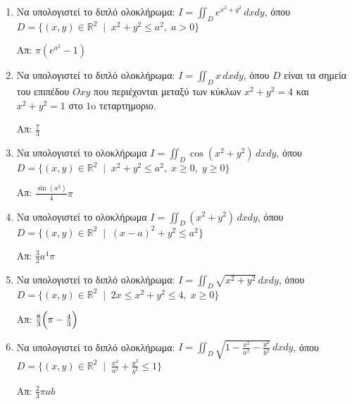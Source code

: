 


\pagestyle{empty}
\everymath{\displaystyle}



\begin{center}
\end{center}

\vspace{\baselineskip}

\begin{enumerate}

\item Να υπολογιστεί το διπλό ολοκλήρωμα: $I=\iint_{D}e^{x^2+y^2}\,dxdy$, όπου $D=\{(x,y)\in\mathbb{R}^2\;\mid\; x^2+y^2\leq a^2,\; a>0\}$

\hfill Απ: $\pi(e^{a^2}-1)$

\item Να υπολογιστεί το διπλό ολοκλήρωμα: $I=\iint_{D}x\,dxdy$, όπου $D$ είναι τα σημεία του επιπέδου $Oxy$ που περιέχονται μεταξύ των κύκλων $x^2+y^2=4$ και $x^2+y^2=1$ στο $1$o τεταρτημοριο.

\hfill Απ: $\frac{7}{3}$

\item Να υπολογιστεί το ολοκλήρωμα $I=\iint_{D}\cos(x^2+y^2)\,dxdy$, όπου
	$D=\{(x,y)\in\mathbb{R}^2\;\mid\; x^2+y^2\leq a^{2},\;x\geq 0,\; y\geq 0\}$

\hfill Απ: $\frac{\sin(a^2)}{4}\pi$

\item Να υπολογιστεί το ολοκλήρωμα $I=\iint_{D}(x^2+y^2)\,dxdy$, όπου $D=\{(x,y)\in\mathbb{R}^2\;\mid\; (x-a)^2+y^2\leq a^2\}$

\hfill Απ: $\frac{3}{2}a^4\pi$

\item Να υπολογιστεί το διπλό ολοκλήρωμα: $I=\iint_{D}\sqrt{x^2+y^2}\,dxdy$, όπου $D=\{(x,y)\in\mathbb{R}^2\;\mid\; 2x\leq x^2+y^2\leq 4,\; x\geq 0\}$

\hfill Απ: $\frac{8}{3}\Bigl(\pi-\frac{4}{3}\Bigr)$

\item Να υπολογιστεί το διπλό ολοκλήρωμα: $I=\iint_{D}\sqrt{1-\frac{x^2}{a^2}-\frac{y^2}{b^2}}\,dxdy$, όπου $D=\{(x,y)\in\mathbb{R}^2\;\mid\;\frac{x^2}{a^2}+\frac{y^2}{b^2}\leq 1\}$

\hfill Απ: $\frac{2}{3}\pi ab$



\end{enumerate}
